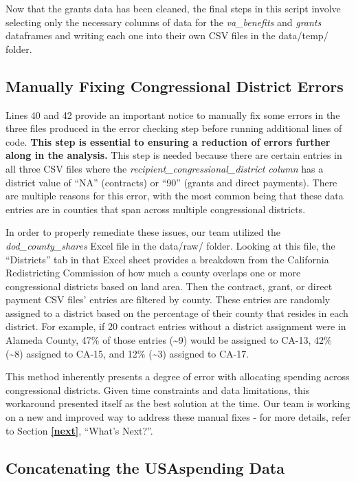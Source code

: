 \documentclass[
]{book}
\begin{document}
Now that the grants data has been cleaned, the final steps in this script involve selecting only the necessary columns of data for the \emph{va\_benefits} and \emph{grants} dataframes and writing each one into their own CSV files in the data/temp/ folder.

\hypertarget{fix-errors}{%
\subsection{Manually Fixing Congressional District Errors}\label{fix-errors}}

Lines 40 and 42 provide an important notice to manually fix some errors in the three files produced in the error checking step before running additional lines of code. \textbf{This step is essential to ensuring a reduction of errors further along in the analysis.} This step is needed because there are certain entries in all three CSV files where the \emph{recipient\_congressional\_district column} has a district value of ``NA'' (contracts) or ``90'' (grants and direct payments). There are multiple reasons for this error, with the most common being that these data entries are in counties that span across multiple congressional districts.

In order to properly remediate these issues, our team utilized the \emph{dod\_county\_shares} Excel file in the data/raw/ folder. Looking at this file, the ``Districts'' tab in that Excel sheet provides a breakdown from the California Redistricting Commission of how much a county overlaps one or more congressional districts based on land area. Then the contract, grant, or direct payment CSV files' entries are filtered by county. These entries are randomly assigned to a district based on the percentage of their county that resides in each district. For example, if 20 contract entries without a district assignment were in Alameda County, 47\% of those entries (\textasciitilde9) would be assigned to CA-13, 42\% (\textasciitilde8) assigned to CA-15, and 12\% (\textasciitilde3) assigned to CA-17.

This method inherently presents a degree of error with allocating spending across congressional districts. Given time constraints and data limitations, this workaround presented itself as the best solution at the time. Our team is working on a new and improved way to address these manual fixes - for more details, refer to Section \textbf{\ref{next}}, ``What's Next?''.

\hypertarget{concat-usa}{%
\subsection{Concatenating the USAspending Data}\label{concat-usa}}
\end{document}
